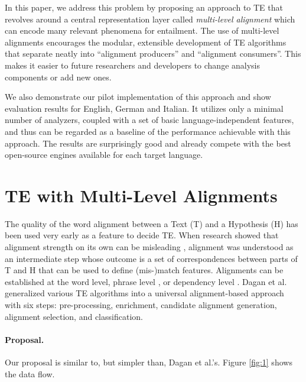\documentclass[11pt,letterpaper]{article}
\begin{document}
In this paper, we address this problem by proposing an approach to TE
that revolves around a central representation layer called {\em
  multi-level alignment} which can encode many relevant phenomena for
entailment. The use of multi-level alignments encourages the modular,
extensible development of TE algorithms that separate neatly into
``alignment producers'' and ``alignment consumers''. This makes it
easier to future researchers and developers to change analysis
components or add new ones. 

We also demonstrate our pilot implementation of this approach and
show evaluation results for English, German and Italian. It utilizes
only a minimal number of analyzers, coupled with a set of basic
language-independent features, and thus can be regarded as a baseline
of the performance achievable with this approach.  The results are
surprisingly good and already compete with the best open-source
engines available for each target language.

\section{TE with Multi-Level Alignments}

The quality of the word alignment between a Text (T) and a Hypothesis
(H) has been used very early as a feature to decide TE. When research
showed that alignment strength on its own can be misleading
\cite{maccartney-EtAl:2006:HLT-NAACL06-Main}, alignment was 
understood as an intermediate step whose outcome is a set of
correspondences between parts of T and H that can be used to define
(mis-)match features. Alignments can be established at the
word level, phrase level \cite{MacCartney:EMNLP08}, or dependency
level \cite{dinu-wang:2009:EACL}. Dagan et
al.  generalized various TE algorithms into
a universal alignment-based approach with six steps: pre-processing,
enrichment, candidate alignment generation, alignment selection, and
classification. 

\paragraph{Proposal.} Our proposal is similar to, but simpler than,
Dagan et al.'s. Figure \ref{fig:1} shows the data flow.
\end{document}
